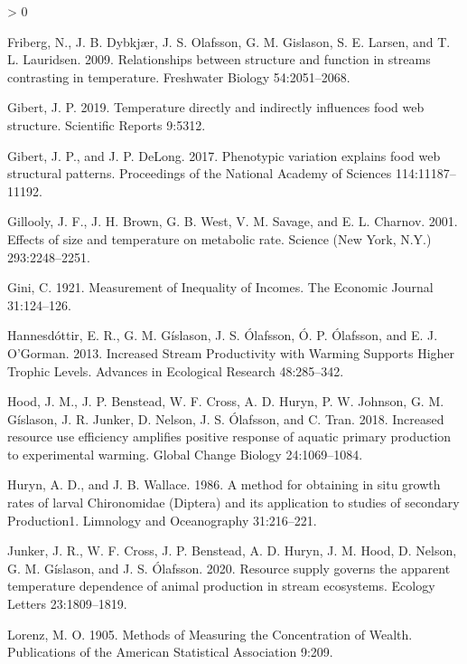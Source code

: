\documentclass[
]{article}
\newlength{\cslhangindent}
\newenvironment{CSLReferences}[2] %
 {%
  \setlength{\parindent}{0pt}
  \ifodd #1 \everypar{\setlength{\hangindent}{\cslhangindent}}\ignorespaces\fi
  \ifnum #2 > 0
  \setlength{\parskip}{#2\baselineskip}
  \fi
 }%
 {}
\begin{document}
\begin{CSLReferences}{1}{0}
\leavevmode\hypertarget{ref-friberg2009}{}%
Friberg, N., J. B. Dybkjær, J. S. Olafsson, G. M. Gislason, S. E.
Larsen, and T. L. Lauridsen. 2009. Relationships between structure and
function in streams contrasting in temperature. Freshwater Biology
54:2051--2068.

\leavevmode\hypertarget{ref-gibert2019}{}%
Gibert, J. P. 2019. Temperature directly and indirectly influences food
web structure. Scientific Reports 9:5312.

\leavevmode\hypertarget{ref-gibert2017}{}%
Gibert, J. P., and J. P. DeLong. 2017. Phenotypic variation explains
food web structural patterns. Proceedings of the National Academy of
Sciences 114:11187--11192.

\leavevmode\hypertarget{ref-gillooly2001}{}%
Gillooly, J. F., J. H. Brown, G. B. West, V. M. Savage, and E. L.
Charnov. 2001. Effects of size and temperature on metabolic rate.
Science (New York, N.Y.) 293:2248--2251.

\leavevmode\hypertarget{ref-gini1921}{}%
Gini, C. 1921. Measurement of {Inequality} of {Incomes}. The Economic
Journal 31:124--126.

\leavevmode\hypertarget{ref-hannesdottir2013}{}%
Hannesdóttir, E. R., G. M. Gíslason, J. S. Ólafsson, Ó. P. Ólafsson, and
E. J. O'Gorman. 2013. Increased {Stream Productivity} with {Warming
Supports Higher Trophic Levels}. Advances in Ecological Research
48:285--342.

\leavevmode\hypertarget{ref-hood2018}{}%
Hood, J. M., J. P. Benstead, W. F. Cross, A. D. Huryn, P. W. Johnson, G.
M. Gíslason, J. R. Junker, D. Nelson, J. S. Ólafsson, and C. Tran. 2018.
Increased resource use efficiency amplifies positive response of aquatic
primary production to experimental warming. Global Change Biology
24:1069--1084.

\leavevmode\hypertarget{ref-huryn1986}{}%
Huryn, A. D., and J. B. Wallace. 1986. A method for obtaining in situ
growth rates of larval {Chironomidae} ({Diptera}) and its application to
studies of secondary Production1. Limnology and Oceanography
31:216--221.

\leavevmode\hypertarget{ref-junker2020}{}%
Junker, J. R., W. F. Cross, J. P. Benstead, A. D. Huryn, J. M. Hood, D.
Nelson, G. M. Gíslason, and J. S. Ólafsson. 2020. Resource supply
governs the apparent temperature dependence of animal production in
stream ecosystems. Ecology Letters 23:1809--1819.

\leavevmode\hypertarget{ref-lorenz1905}{}%
Lorenz, M. O. 1905. Methods of {Measuring} the {Concentration} of
{Wealth}. Publications of the American Statistical Association 9:209.


\end{CSLReferences}
\end{document}
